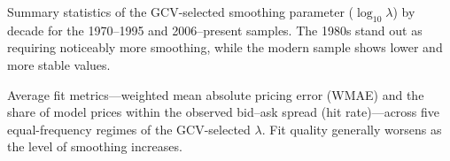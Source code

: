 \documentclass{article}
\begin{document}
\begin{table}[htbp]
\centering
\resizebox{0.75\textwidth}{!}{

}
\caption{Summary statistics of the GCV-selected smoothing parameter ($\log_{10}\lambda$) by decade for the 1970--1995 and 2006--present samples. The 1980s stand out as requiring noticeably more smoothing, while the modern sample shows lower and more stable values.}
\label{tab:lambda_decade}
\end{table}

\begin{table}[htbp]
\centering
\resizebox{0.75\textwidth}{!}{

}
\caption{Average fit metrics—weighted mean absolute pricing error (WMAE) and the share of model prices within the observed bid--ask spread (hit rate)—across five equal-frequency regimes of the GCV-selected $\lambda$. Fit quality generally worsens as the level of smoothing increases.}
\label{tab:lambda_regime}
\end{table}
\end{document}

